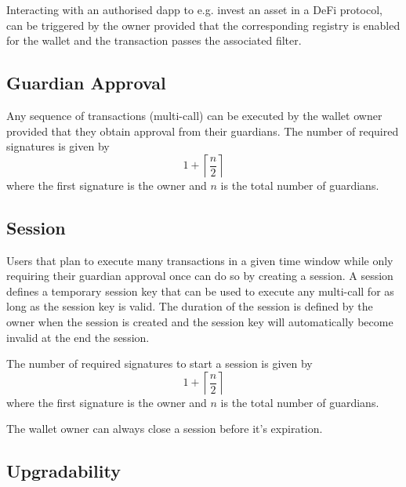 \documentclass[12pt]{article}
\begin{document}
Interacting with an authorised dapp to e.g. invest an asset in a DeFi protocol, can be triggered by the owner provided that the corresponding registry is enabled for the wallet and the transaction passes the associated filter.

\subsection{Guardian Approval}
\label{sec:guardian-approval}

Any sequence of transactions (multi-call) can be executed by the wallet owner provided that they obtain approval from their guardians. The number of required signatures is given by
\begin{equation*}
    1+\left\lceil {\frac{n}{2}} \right\rceil
\end{equation*}
where the first signature is the owner and $n$ is the total number of guardians.

\subsection{Session}
\label{sec:session}

Users that plan to execute many transactions in a given time window while only requiring their guardian approval once can do so by creating a session. A session defines a temporary session key that can be used to execute any multi-call for as long as the session key is valid. The duration of the session is defined by the owner when the session is created and the session key will automatically become invalid at the end the session.

The number of required signatures to start a session is given by
\begin{equation*}
    1+\left\lceil {\frac{n}{2}} \right\rceil
\end{equation*}
where the first signature is the owner and $n$ is the total number of guardians.

The wallet owner can always close a session before it's expiration.

\subsection{Upgradability}
\end{document}
